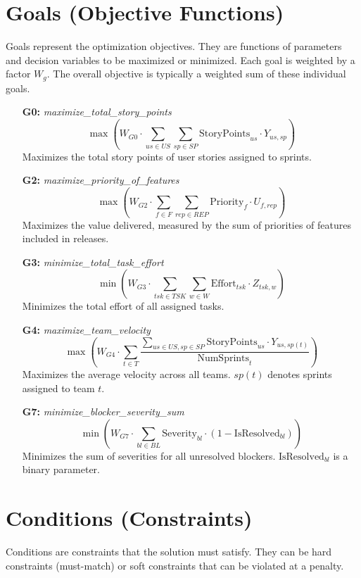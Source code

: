 \documentclass[a4paper, 11pt]{article}
\begin{document}
\section{Goals (Objective Functions)}
\label{sec:goals}
Goals represent the optimization objectives. They are functions of parameters and decision variables to be maximized or minimized. Each goal is weighted by a factor $W_g$. The overall objective is typically a weighted sum of these individual goals.

\begin{itemize}
    \item[\textbf{G0:}] \textit{maximize\_total\_story\_points}
    $$ \max \left( W_{G0} \cdot \sum_{us \in US} \sum_{sp \in SP} \text{StoryPoints}_{us} \cdot Y_{us,sp} \right) $$
    Maximizes the total story points of user stories assigned to sprints.

    \item[\textbf{G2:}] \textit{maximize\_priority\_of\_features}
    $$ \max \left( W_{G2} \cdot \sum_{f \in F} \sum_{rep \in REP} \text{Priority}_f \cdot U_{f,rep} \right) $$
    Maximizes the value delivered, measured by the sum of priorities of features included in releases.

    \item[\textbf{G3:}] \textit{minimize\_total\_task\_effort}
    $$ \min \left( W_{G3} \cdot \sum_{tsk \in TSK} \sum_{w \in W} \text{Effort}_{tsk} \cdot Z_{tsk,w} \right) $$
    Minimizes the total effort of all assigned tasks.

    \item[\textbf{G4:}] \textit{maximize\_team\_velocity}
    $$ \max \left( W_{G4} \cdot \sum_{t \in T} \frac{\sum_{us \in US, sp \in SP} \text{StoryPoints}_{us} \cdot Y_{us,sp(t)}}{\text{NumSprints}_t} \right) $$
    Maximizes the average velocity across all teams. $sp(t)$ denotes sprints assigned to team $t$.

    \item[\textbf{G7:}] \textit{minimize\_blocker\_severity\_sum}
    $$ \min \left( W_{G7} \cdot \sum_{bl \in BL} \text{Severity}_{bl} \cdot (1 - \text{IsResolved}_{bl}) \right) $$
    Minimizes the sum of severities for all unresolved blockers. $\text{IsResolved}_{bl}$ is a binary parameter.
\end{itemize}

\section{Conditions (Constraints)}
\label{sec:conditions}
Conditions are constraints that the solution must satisfy. They can be hard constraints (must-match) or soft constraints that can be violated at a penalty.
\end{document}

